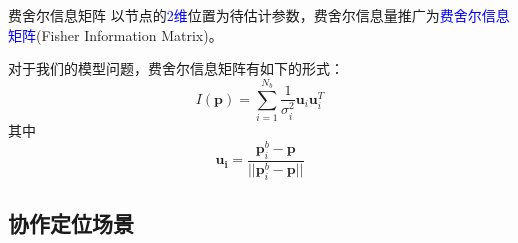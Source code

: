\documentclass[notheorems,xetex,mathserif,serif]{beamer}
\begin{document}
\begin{frame}{费舍尔信息矩阵}
以节点的\textcolor{blue}{2维}位置为待估计参数，费舍尔信息量推广为\textcolor{blue}{费舍尔信息矩阵}(Fisher Information Matrix)。

对于我们的模型问题，费舍尔信息矩阵有如下的形式：
\begin{equation}\label{eq:uu}
I(\bm{p})=\displaystyle\sum_{i=1}^{N_b}\frac{1}{\sigma_i^2}\bm{u}_i\bm{u}_i^T
\end{equation}
其中
\begin{equation}
\bm{u_i}=\frac{\bm{p}^b_i-\bm{p}}{||\bm{p}^b_i-\bm{p}||}
\end{equation}

\end{frame}
\subsection[协作定位场景]{协作定位场景}
\end{document}
